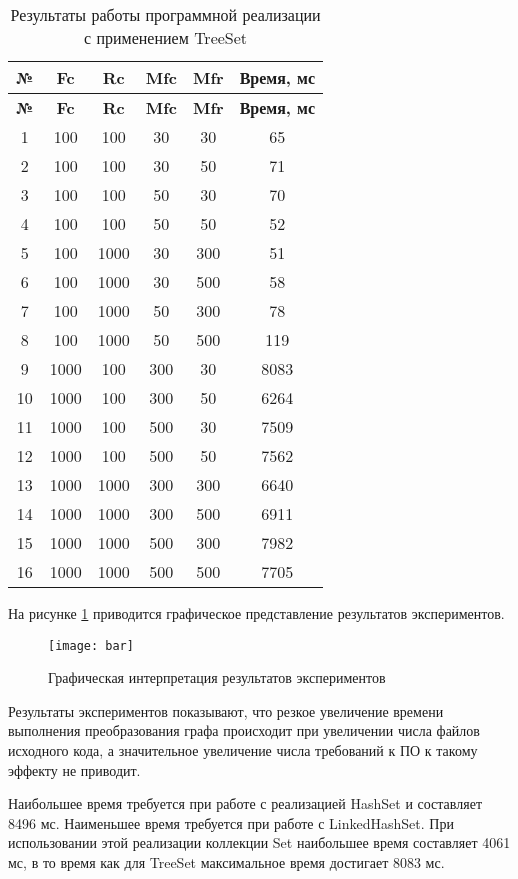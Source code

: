 \begin{longtable}{|c|c|c|c|c|c|}
    \caption{Результаты работы программной реализации с применением TreeSet}
    \label{tab:treeset}\\
    \hline
    \bfseries{№} & \bfseries{Fc} & \bfseries{Rc} & \bfseries{Mfc} & \bfseries{Mfr} & \bfseries{Время, мс} \\
    \hline
    \endfirsthead
    \hline
    \bfseries{№} & \bfseries{Fc} & \bfseries{Rc} & \bfseries{Mfc} & \bfseries{Mfr} & \bfseries{Время, мс} \\
    \hline
    \endhead
    \hline
    1 & 100 & 100 & 30 & 30 & 65 \\
    \hline
    2 & 100 & 100 & 30 & 50 & 71 \\
    \hline
    3 & 100 & 100 & 50 & 30 & 70 \\
    \hline
    4 & 100 & 100 & 50 & 50 & 52 \\
    \hline
    5 & 100 & 1000 & 30 & 300 & 51 \\
    \hline
    6 & 100 & 1000 & 30 & 500 & 58 \\
    \hline
    7 & 100 & 1000 & 50 & 300 & 78 \\
    \hline
    8 & 100 & 1000 & 50 & 500 & 119 \\
    \hline
    9 & 1000 & 100 & 300 & 30 & 8083 \\
    \hline
    10 & 1000 & 100 & 300 & 50 & 6264 \\
    \hline
    11 & 1000 & 100 & 500 & 30 & 7509 \\
    \hline
    12 & 1000 & 100 & 500 & 50 & 7562 \\
    \hline
    13 & 1000 & 1000 & 300 & 300 & 6640 \\
    \hline
    14 & 1000 & 1000 & 300 & 500 & 6911 \\
    \hline
    15 & 1000 & 1000 & 500 & 300 & 7982 \\
    \hline
    16 & 1000 & 1000 & 500 & 500 & 7705 \\
    \hline
\end{longtable}

На рисунке \ref{fig:bar} приводится графическое представление результатов экспериментов.

\begin{figure}[H]
    \centering
    \texttt{[image: bar]}
    \caption{Графическая интерпретация результатов экспериментов}
    \label{fig:bar}
\end{figure}

Результаты экспериментов показывают, что резкое увеличение времени выполнения преобразования графа происходит при увеличении числа файлов исходного кода, а значительное увеличение числа требований к ПО к такому эффекту не приводит.

Наибольшее время требуется при работе с реализацией HashSet и составляет 8496 мс. Наименьшее время требуется при работе с LinkedHashSet. При использовании этой реализации коллекции Set наибольшее время составляет 4061 мс, в то время как для TreeSet максимальное время достигает 8083 мс.